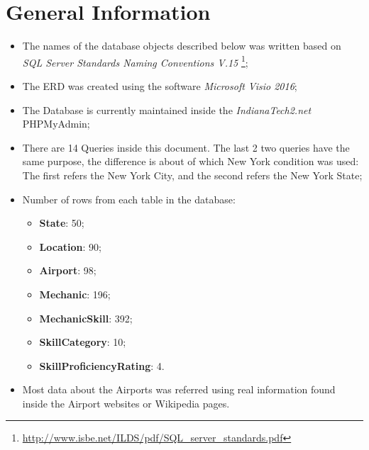 \chapter{General Information}
	\begin{itemize}
		\item{The names of the database objects described below was written based on \textit{SQL Server Standards Naming Conventions V.15} \footnote{\url{http://www.isbe.net/ILDS/pdf/SQL_server_standards.pdf}};}
		\item{The ERD was created using the software \textit{Microsoft Visio 2016};}
		\item{The Database is currently maintained inside the \textit{IndianaTech2.net} PHPMyAdmin;}
		\item{There are 14 Queries inside this document. The last 2 two queries have the same purpose, the difference is about of which New York condition was used: The first refers the New York
		City, and the second refers the New York State;}
		\item{Number of rows from each table in the database:
			\begin{itemize}
				\item{\textbf{State}: 50;}
				\item{\textbf{Location}: 90;}
				\item{\textbf{Airport}: 98;}
				\item{\textbf{Mechanic}: 196;}
				\item{\textbf{MechanicSkill}: 392;}
				\item{\textbf{SkillCategory}: 10;}
				\item{\textbf{SkillProficiencyRating}: 4.}
			\end{itemize}}
		\item{Most data about the Airports was referred using real information found inside the Airport websites or Wikipedia pages.}
	\end{itemize}
















